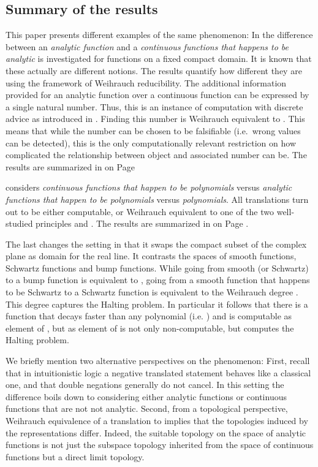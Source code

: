 \documentclass{eptcs-modified}
\begin{document}
	\subsection{Summary of the results}
		This paper presents different examples of the same phenomenon:
		In  the difference between an \emph{analytic function} and a \emph{continuous functions that happens to be analytic} is investigated for functions on a fixed compact domain.
		It is known that these actually are different notions.
		The results quantify how different they are using the framework of Weihrauch reducibility.
		The additional information provided for an analytic function over a continuous function can be expressed by a single natural number.
		Thus, this is an instance of computation with discrete advice as introduced in \cite{MR2915702}.
		Finding this number is Weihrauch equivalent to .
		This means that while the number can be chosen to be falsifiable (i.e.~wrong values can be detected), this is the only computationally relevant restriction on how complicated the relationship between object and associated number can be.
		The results are summarized in  on Page \pageref{figure:reductions}

		 considers \emph{continuous functions that happen to be polynomials} versus \emph{analytic functions that happen to be polynomials} versus \emph{polynomials}.
		All translations turn out to be either computable, or Weihrauch equivalent to one of the two well-studied principles  and .
		The results are summarized in  on Page \pageref{figure:reductions for polynomials}.

		The last  changes the setting in that it swaps the compact subset of the complex plane as domain for the real line.
		It contrasts the spaces of smooth functions, Schwartz functions and bump functions.
		While going from smooth (or Schwartz) to a bump function is equivalent to , going from a smooth function that happens to be Schwartz to a Schwartz function is equivalent to the Weihrauch degree .
		This degree captures the Halting problem.
		In particular it follows that there is a function  that decays faster than any polynomial (i.e. ) and is computable as element of , but as element of  is not only  non-computable, but computes the Halting problem.

		We briefly mention two alternative perspectives on the phenomenon:
		First, recall that in intuitionistic logic a negative translated statement behaves like a classical one, and that double negations generally do not cancel.
		In this setting the difference boils down to considering either analytic functions or continuous functions that are not not analytic.
		Second, from a topological perspective, Weihrauch equivalence of a translation to  implies that the topologies induced by the representations differ.
		Indeed, the suitable topology on the space of analytic functions is not just the subspace topology inherited from the space of continuous functions but a direct limit topology.
\end{document}

